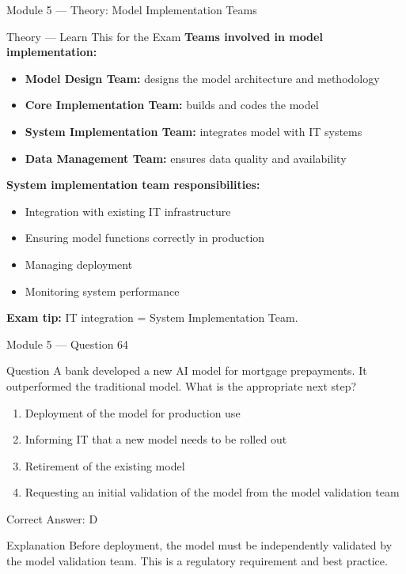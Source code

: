 \documentclass[aspectratio=169,10pt]{beamer}
\newcommand{\question}[1]{%
	\begin{block}{Question}
		#1
	\end{block}
}
\newcommand{\options}[4]{%
	\begin{enumerate}[label=\Alph*.,leftmargin=*]
		\item #1
		\item #2
		\item #3
		\item #4
	\end{enumerate}
}
\newcommand{\answerbox}[1]{%
	\begin{exampleblock}{Correct Answer: #1}
	\end{exampleblock}
}
\newcommand{\explain}[1]{%
	\begin{block}{Explanation}
		\small #1
	\end{block}
}
\newcommand{\theory}[1]{%
	\begin{block}{Theory --- Learn This for the Exam}
		\small #1
	\end{block}
}
\begin{document}
	\begin{frame}{Module 5 --- Theory: Model Implementation Teams}
		\theory{
			\textbf{Teams involved in model implementation:}
			\begin{itemize}
				\item \textbf{Model Design Team:} designs the model architecture and methodology
				\item \textbf{Core Implementation Team:} builds and codes the model
				\item \textbf{System Implementation Team:} integrates model with IT systems
				\item \textbf{Data Management Team:} ensures data quality and availability
			\end{itemize}
			\textbf{System implementation team responsibilities:}
			\begin{itemize}
				\item Integration with existing IT infrastructure
				\item Ensuring model functions correctly in production
				\item Managing deployment
				\item Monitoring system performance
			\end{itemize}
			\textbf{Exam tip:} IT integration = System Implementation Team.
		}
	\end{frame}
	
	\begin{frame}{Module 5 --- Question 64}
		\question{A bank developed a new AI model for mortgage prepayments. It outperformed the traditional model. What is the appropriate next step?}
		\options{Deployment of the model for production use}{Informing IT that a new model needs to be rolled out}{Retirement of the existing model}{Requesting an initial validation of the model from the model validation team}
		\answerbox{D}
		\explain{Before deployment, the model must be independently validated by the model validation team. This is a regulatory requirement and best practice.}
	\end{frame}
	
\end{document}
